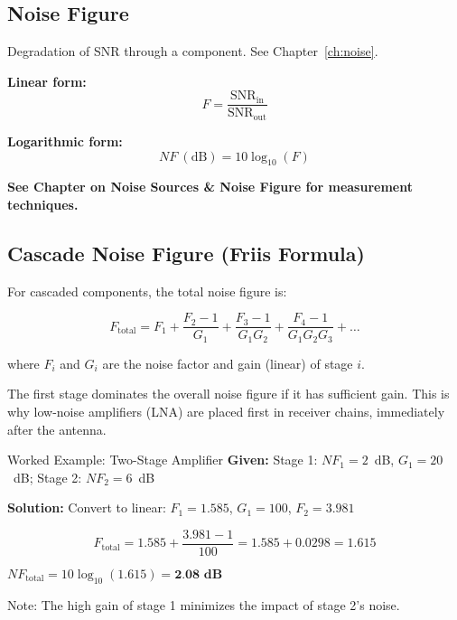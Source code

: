 \subsection{Noise Figure}
\label{sec:noise-figure}

Degradation of SNR through a component. See Chapter~\ref{ch:noise}.

\textbf{Linear form:}
\begin{equation}
F = \frac{\text{SNR}_{\text{in}}}{\text{SNR}_{\text{out}}}
\label{eq:noise-figure}
\end{equation}

\textbf{Logarithmic form:}
\begin{equation}
\label{eq:noise-figure-db}
NF\ (\text{dB}) = 10\log_{10}(F)
\end{equation}

\textbf{See Chapter on Noise Sources \& Noise Figure for measurement techniques.}

\subsection{Cascade Noise Figure (Friis Formula)}
\label{subsec:cascade-noise-figure}

For cascaded components, the total noise figure is:

\begin{equation}
\label{eq:friis-noise}
F_{\text{total}} = F_1 + \frac{F_2 - 1}{G_1} + \frac{F_3 - 1}{G_1 G_2} + \frac{F_4 - 1}{G_1 G_2 G_3} + \ldots
\end{equation}

where $F_i$ and $G_i$ are the noise factor and gain (linear) of stage $i$.

\begin{keyconcept}
The first stage dominates the overall noise figure if it has sufficient gain. This is why low-noise amplifiers (LNA) are placed first in receiver chains, immediately after the antenna.
\end{keyconcept}

\begin{calloutbox}{Worked Example: Two-Stage Amplifier}
\textbf{Given:} Stage 1: $NF_1 = 2$~dB, $G_1 = 20$~dB; Stage 2: $NF_2 = 6$~dB

\textbf{Solution:} Convert to linear: $F_1 = 1.585$, $G_1 = 100$, $F_2 = 3.981$

\[
F_{\text{total}} = 1.585 + \frac{3.981 - 1}{100} = 1.585 + 0.0298 = 1.615
\]

$NF_{\text{total}} = 10\log_{10}(1.615) = \textbf{2.08~dB}$

Note: The high gain of stage 1 minimizes the impact of stage 2's noise.
\end{calloutbox}


